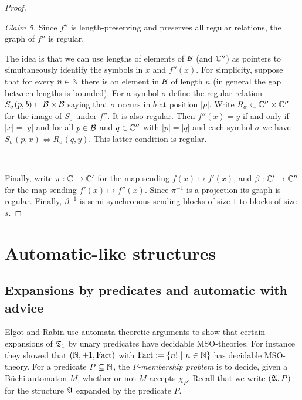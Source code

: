 \begin{proof}
\

\noindent
{\em Claim 5.} Since $f''$ is length-preserving and preserves all regular relations, the graph of $f''$ is regular. 

The idea is that we can use lengths of elements of ${\mathcal B}$ (and $\mathbb{C}''$) as pointers to simultaneously identify the symbols in $x$ and $f''(x)$. For simplicity, suppose that for every $n \in \mathbb{N}$ there is an element in ${\mathcal B}$  of length $n$ (in general the gap between lengths is bounded). For a symbol $\sigma$ define the regular relation $S_\sigma(p,b) \subset {\mathcal B} \times {\mathcal B}$ saying that $\sigma$ occurs in $b$ at position $|p|$. Write $R_\sigma \subset \mathbb{C}'' \times \mathbb{C}''$ for the image of $S_\sigma$ under $f''$. It is also regular. Then $f''(x) = y$ if and only if $|x| = |y|$ and for all $p \in {\mathcal B}$
and $q \in \mathbb{C}''$ with $|p| = |q|$ and each symbol $\sigma$ we have $S_\sigma(p,x) \iff R_\sigma(q,y)$. This latter condition is regular.

\


Finally, write $\pi:\mathbb{C} \to \mathbb{C}'$ for the map sending $f(x) \mapsto f'(x)$, and $\beta:\mathbb{C}' \to \mathbb{C}''$ for the map sending $f'(x) \mapsto f''(x)$.
Since $\pi^{-1}$ is a projection its graph is regular.
Finally, $\beta^{-1}$ is semi-synchronous sending blocks of size $1$ to blocks of size $s$.
\end{proof}



\section{Automatic-like structures}  \label{AS:sec:gen} 

\subsection{Expansions by predicates and automatic with advice}

 
Elgot and Rabin \cite{ElRa66} use automata theoretic arguments to show that certain expansions of $\mathfrak{T}_1$ by unary
predicates have decidable MSO-theories.  For instance they showed that $(\mathbb{N},+1,\textrm{Fact})$
with $\textrm{Fact} := \{n! \ \vert \  n \in \mathbb{N}\}$ has decidable MSO-theory.  For a predicate $P \subseteq \mathbb{N}$, the {\em $P$-membership problem} is to decide, given a B\"uchi-automaton $M$,  whether or not $M$ accepts $\chi_P$. Recall that we write $(\mathfrak{A},P)$ for the structure $\mathfrak{A}$ expanded by the predicate $P$.

